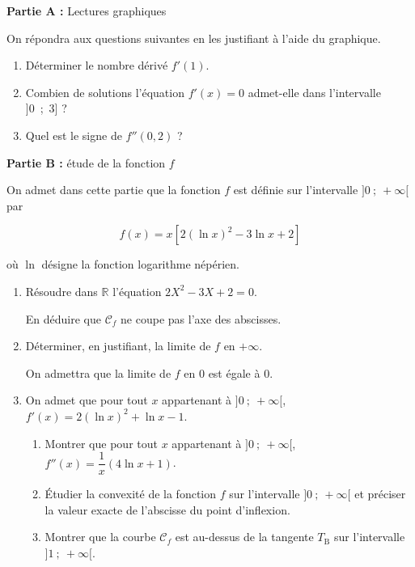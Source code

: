 \documentclass[10pt]{article}
\providecommand{\R}{\mathbb{R}}
\begin{document}
\begin{center}\textbf{Partie A :} Lectures graphiques\end{center}

On répondra aux questions suivantes en les justifiant à l'aide du graphique.

\medskip
\begin{enumerate}
\item Déterminer le nombre dérivé $f'(1)$.
\item Combien de solutions l'équation $f'(x) = 0$ admet-elle dans l'intervalle ]0~;~3] ?
\item Quel est le signe de $f''(0,2)$ ?
\end{enumerate}


\begin{center}\textbf{Partie B :} étude de la fonction $f$\end{center}

On admet dans cette partie que la fonction $f$ est définie sur l'intervalle $]0~;~ +\infty[$ par

\[f(x) = x[2(\ln x)^2 - 3\ln x + 2 ]\]

où $\ln$ désigne la fonction logarithme népérien.

\medskip

\begin{enumerate}
\item Résoudre dans $\R$ l'équation $2X^2- 3X + 2 = 0$.

En déduire que $\mathcal{C}_f$ ne coupe pas l'axe des abscisses.
\item Déterminer, en justifiant, la limite de $f$ en $+\infty$.

On admettra que la limite de $f$ en 0 est égale à 0.
\item On admet que pour tout $x$ appartenant à $]0~;~ +\infty[$, \: $f'(x) = 2(\ln x)^2 + \ln x - 1$.
	\begin{enumerate}
		\item Montrer que pour tout $x$ appartenant à $]0~;~ +\infty[$,\: $f''(x)= \dfrac 1x(4\ln x + 1)$.
		\item Étudier la convexité de la fonction $f$ sur l'intervalle $]0~;~ +\infty[$ et préciser la valeur exacte de l'abscisse du point d'inflexion.
		\item Montrer que la courbe $\mathcal{C}_f$ est au-dessus de la tangente $T_{\text{B}}$ sur l'intervalle $]1~;~ +\infty[$.
	\end{enumerate}
\end{enumerate}
\end{document}
